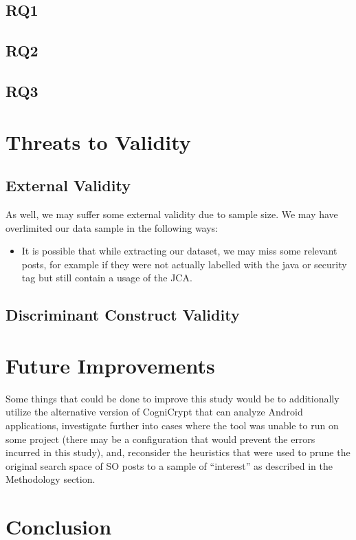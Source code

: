 \documentclass[10pt, conference]{IEEEtran}
\begin{document}
\subsection{RQ1}




\subsection{RQ2}






\subsection{RQ3}



\section{Threats to Validity}

\subsection{External Validity}
As well, we may suffer some external validity due to sample size. We may have overlimited our data sample in the following ways:

\begin{itemize}
\item
It is possible that while extracting our dataset, we may miss some relevant posts, for example if they were not actually labelled with the java or security tag but still contain a usage of the JCA. 


\end{itemize}

\subsection{Discriminant Construct Validity}



\section{Future Improvements}
Some things that could be done to improve this study would be to additionally utilize the alternative version of CogniCrypt that can analyze Android applications, investigate further into cases where the tool was unable to run on some project (there may be a configuration that would prevent the errors incurred in this study), and, reconsider the heuristics that were used to prune the original search space of SO posts to a sample of “interest” as described in the Methodology section. 

\section{Conclusion}


\printbibliography
\end{document}
